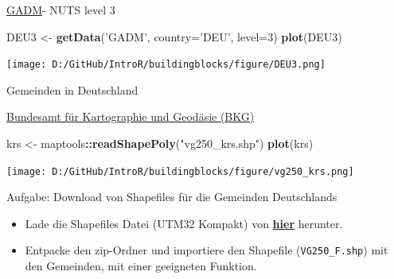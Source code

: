 \documentclass[ignorenonframetext,]{beamer}
\newenvironment{Shaded}{\begin{snugshade}}{\end{snugshade}}
\newcommand{\DataTypeTok}[1]{\textcolor[rgb]{0.13,0.29,0.53}{#1}}
\newcommand{\DecValTok}[1]{\textcolor[rgb]{0.00,0.00,0.81}{#1}}
\newcommand{\KeywordTok}[1]{\textcolor[rgb]{0.13,0.29,0.53}{\textbf{#1}}}
\newcommand{\NormalTok}[1]{#1}
\newcommand{\OperatorTok}[1]{\textcolor[rgb]{0.81,0.36,0.00}{\textbf{#1}}}
\newcommand{\StringTok}[1]{\textcolor[rgb]{0.31,0.60,0.02}{#1}}
\providecommand{\tightlist}{%
  \setlength{\itemsep}{0pt}\setlength{\parskip}{0pt}}
\begin{document}
\begin{frame}[fragile]{\href{http://www.gadm.org/}{GADM}- NUTS level 3}
\protect\hypertarget{gadm--nuts-level-3-1}{}

\begin{Shaded}
\begin{Highlighting}[]
\NormalTok{DEU3 <-}\StringTok{ }\KeywordTok{getData}\NormalTok{(}\StringTok{'GADM'}\NormalTok{, }\DataTypeTok{country=}\StringTok{'DEU'}\NormalTok{, }\DataTypeTok{level=}\DecValTok{3}\NormalTok{)}
\KeywordTok{plot}\NormalTok{(DEU3)}
\end{Highlighting}
\end{Shaded}

\texttt{[image: D:/GitHub/IntroR/buildingblocks/figure/DEU3.png]}

\end{frame}

\begin{frame}[fragile]{Gemeinden in Deutschland}
\protect\hypertarget{gemeinden-in-deutschland}{}

\href{http://www.geodatenzentrum.de/geodaten/gdz_rahmen.gdz_div?gdz_spr=deu\&gdz_akt_zeile=5\&gdz_anz_zeile=1\&gdz_unt_zeile=15\&gdz_user_id=0}{Bundesamt
für Kartographie und Geodäsie (BKG)}

\begin{Shaded}
\begin{Highlighting}[]
\NormalTok{krs <-}\StringTok{ }\NormalTok{maptools}\OperatorTok{::}\KeywordTok{readShapePoly}\NormalTok{(}\StringTok{"vg250_krs.shp"}\NormalTok{)}
\KeywordTok{plot}\NormalTok{(krs)}
\end{Highlighting}
\end{Shaded}

\texttt{[image: D:/GitHub/IntroR/buildingblocks/figure/vg250\_krs.png]}

\end{frame}

\begin{frame}[fragile]{Aufgabe: Download von Shapefiles für die
Gemeinden Deutschlands}
\protect\hypertarget{aufgabe-download-von-shapefiles-fur-die-gemeinden-deutschlands}{}

\begin{itemize}
\tightlist
\item
  Lade die Shapefiles Datei (UTM32 Kompakt) von
  \href{http://www.geodatenzentrum.de/geodaten/gdz_rahmen.gdz_div?gdz_spr=deu\&gdz_akt_zeile=5\&gdz_anz_zeile=1\&gdz_unt_zeile=15\&gdz_user_id=0}{\textbf{hier}}
  herunter.
\item
  Entpacke den zip-Ordner und importiere den Shapefile
  (\texttt{VG250\_F.shp}) mit den Gemeinden, mit einer geeigneten
  Funktion.
\end{itemize}

\end{frame}
\end{document}
